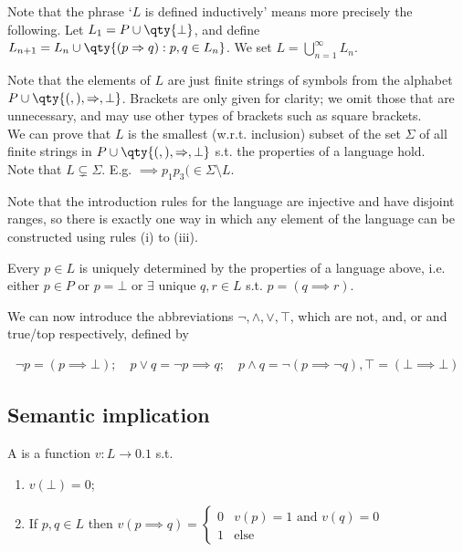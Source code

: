 \begin{remark}
    Note that the phrase `$L$ is defined inductively' means more precisely the following.
    Let $L_1 = P \cup \qty{\bot}$, and define $L_{n+1} = L_n \cup \qty{(p \implies q) : p, q \in L_n}$.
    We set $L = \bigcup_{n=1}^\infty L_n$.

    Note that the elements of $L$ are just finite strings of symbols from the alphabet $P \cup \qty{(, ), \implies, \bot}$.
    Brackets are only given for clarity; we omit those that are unnecessary, and may use other types of brackets such as square brackets. \\
    We can prove that $L$ is the smallest (w.r.t. inclusion) subset of the set $\Sigma$ of all finite strings in $P \cup \qty{(, ), \implies, \bot}$ s.t. the properties of a language hold. \\
    Note that $L \subsetneq \Sigma$. E.g. $\implies p_1 p_3 ( \in \Sigma \setminus L$.

    Note that the introduction rules for the language are injective and have disjoint ranges, so there is exactly one way in which any element of the language can be constructed using rules (i) to (iii).

    Every $p \in L$ is uniquely determined by the properties of a language above, i.e. either $p \in P$ or $p = \bot$ or $\exists$ unique $q, r \in L$ s.t. $p = (q \implies r)$.
\end{remark}

We can now introduce the abbreviations $\neg, \wedge, \vee, \top$, which are not, and, or and true/top respectively, defined by
\begin{notation}
    \begin{align*}
        \neg p = (p \implies \bot);\quad p \vee q = \neg p \implies q;\quad p \wedge q = \neg (p \implies \neg q), \top = (\bot \implies \bot)
    \end{align*}
\end{notation}

\subsection{Semantic implication}
\begin{definition}[Valuation]
    A  is a function $v \colon L \to \qty{0,1}$ s.t.
    \begin{enumerate}
        \item $v(\bot) = 0$;
        \item If $p, q \in L$ then
        $v(p \implies q) = \begin{cases}
            0 & v(p) = 1 \text{ and } v(q) = 0 \\
            1 & \text{else}
        \end{cases}$
    \end{enumerate}
\end{definition}

